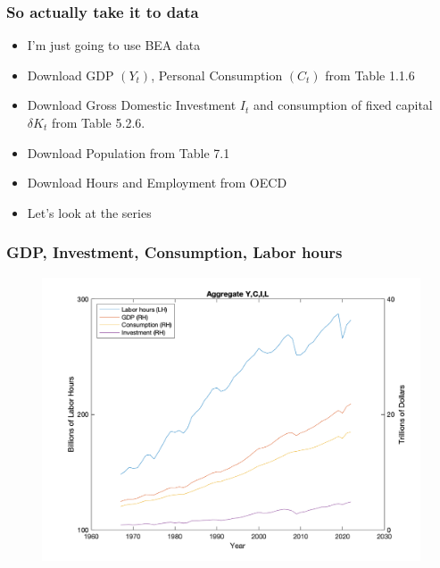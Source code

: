 \documentclass{beamer}
\begin{document}
\begin{frame}
\frametitle[alignment=center]{So actually take it to data}
\begin{itemize}
\item I'm just going to use BEA data
\bigskip
\item Download GDP $(Y_t)$, Personal Consumption $(C_t)$ from Table 1.1.6
\bigskip
\item Download Gross Domestic Investment $I_t$ and consumption of fixed capital $\delta K_t$ from Table 5.2.6.
\bigskip
\item Download Population from Table 7.1
\bigskip
\item Download Hours and Employment from OECD
\bigskip
\item Let's look at the series
\end{itemize}
\end{frame}

\begin{frame}
\frametitle[alignment=center]{GDP, Investment, Consumption, Labor hours}
\begin{figure}
\centering
\includegraphics[scale=0.5]{Figures/Figure_1.png}
\end{figure}
\end{frame}
\end{document}
